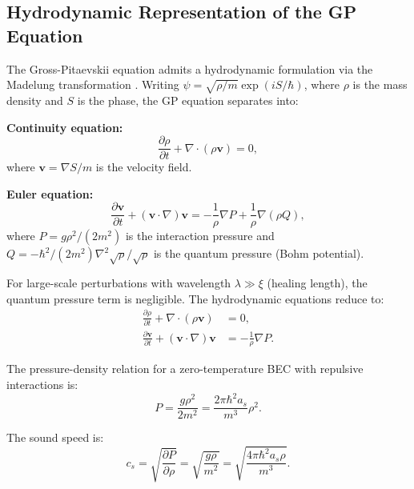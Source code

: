 \documentclass[11pt,a4paper]{article}
\theoremstyle{definition}
\theoremstyle{remark}
\begin{document}
\subsection{Hydrodynamic Representation of the GP Equation}
\label{sec:hydrodynamic_gp}

The Gross-Pitaevskii equation admits a hydrodynamic formulation via the Madelung transformation \cite{Madelung1927}. Writing $\psi = \sqrt{\rho/m}\exp(i S/\hbar)$, where $\rho$ is the mass density and $S$ is the phase, the GP equation separates into:

\textbf{Continuity equation:}
\begin{equation}
\label{eq:gp_continuity}
\frac{\partial\rho}{\partial t} + \nabla \cdot (\rho \mathbf{v}) = 0,
\end{equation}
where $\mathbf{v} = \nabla S/m$ is the velocity field.

\textbf{Euler equation:}
\begin{equation}
\label{eq:gp_euler}
\frac{\partial \mathbf{v}}{\partial t} + (\mathbf{v} \cdot \nabla)\mathbf{v} = -\frac{1}{\rho}\nabla P + \frac{1}{\rho}\nabla(\rho Q),
\end{equation}
where $P = g\rho^2/(2m^2)$ is the interaction pressure and $Q = -\hbar^2/(2m^2)\nabla^2\sqrt{\rho}/\sqrt{\rho}$ is the quantum pressure (Bohm potential).

For large-scale perturbations with wavelength $\lambda \gg \xi$ (healing length), the quantum pressure term is negligible. The hydrodynamic equations reduce to:
\begin{align}
\frac{\partial\rho}{\partial t} + \nabla \cdot (\rho \mathbf{v}) &= 0, \label{eq:continuity_classical} \\
\frac{\partial \mathbf{v}}{\partial t} + (\mathbf{v} \cdot \nabla)\mathbf{v} &= -\frac{1}{\rho}\nabla P. \label{eq:euler_classical}
\end{align}

The pressure-density relation for a zero-temperature BEC with repulsive interactions is:
\begin{equation}
\label{eq:pressure_density}
P = \frac{g\rho^2}{2m^2} = \frac{2\pi\hbar^2 a_s}{m^3}\rho^2.
\end{equation}

The sound speed is:
\begin{equation}
\label{eq:sound_speed_gp}
c_s = \sqrt{\frac{\partial P}{\partial \rho}} = \sqrt{\frac{g\rho}{m^2}} = \sqrt{\frac{4\pi\hbar^2 a_s \rho}{m^3}}.
\end{equation}
\end{document}
